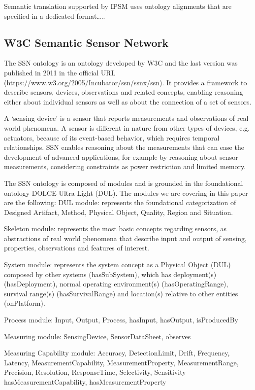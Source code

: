 \documentclass{sig-alternate-05-2015}
\begin{document}
Semantic translation supported by IPSM uses ontology alignments that are specified in a dedicated format….. 


\subsection{W3C Semantic Sensor Network}
The SSN ontology is an ontology developed by W3C and the last version was published in 2011 in the official URL (https://www.w3.org/2005/Incubator/ssn/ssnx/ssn). It provides a framework to describe sensors, devices, observations and related concepts, enabling reasoning either about individual sensors as well as about the connection of a set of sensors. 

A ‘sensing device’ is a sensor that reports measurements and observations of real world phenomena. A sensor is different in nature from other types of devices, e.g. actuators, because of its event-based behavior, which requires temporal relationships. SSN enables reasoning about the measurements that can ease the development of advanced applications, for example by reasoning about sensor measurements, considering constraints as power restriction and limited memory. 

The SSN ontology is composed of modules and is grounded in the foundational ontology DOLCE Ultra-Light (DUL). The modules we are covering in this paper are the following:
DUL module: represents the foundational categorization of Designed Artifact, Method, Physical Object, Quality, Region and Situation.  

Skeleton module: represents the most basic concepts regarding sensors, as abstractions of real world phenomena that describe input and output of sensing, properties, observations and features of interest.

System module: represents the system concept as a Physical Object (DUL) composed by other systems (hasSubSystem), which has deployment(s) (hasDeployment), normal operating environment(s) (hasOperatingRange), survival range(s) (hasSurvivalRange) and location(s) relative to other entities (onPlatform).

Process module: Input, Output, Process, hasInput, hasOutput, isProducedBy

Measuring module: SensingDevice, SensorDataSheet, observes

Measuring Capability module: Accuracy, DetectionLimit, Drift, Frequency, Latency, MeasurementCapability, MeasurementProperty, MeasurementRange, Precision, Resolution, ResponseTime, Selectivity, Sensitivity	hasMeasurementCapability, hasMeasurementProperty
\end{document}
